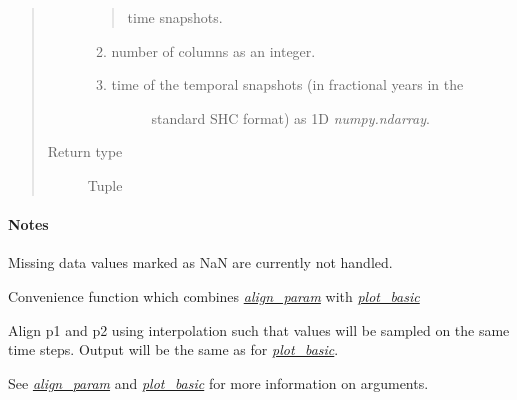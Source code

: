 \documentclass[letterpaper,10pt,english]{sphinxhowto}
\begin{document}
\begin{fulllineitems}
\begin{quote}
\begin{description}
\begin{quote}
time snapshots.
\end{quote}
\begin{enumerate}
\setcounter{enumi}{1}
\item {} 
number of columns as an integer.

\item {} \begin{description}
\item[{time of the temporal snapshots (in fractional years in the}] \leavevmode
standard SHC format) as 1D \emph{numpy.ndarray}.

\end{description}

\end{enumerate}


\item[{Return type}] \leavevmode
Tuple

\end{description}\end{quote}
\paragraph{Notes}

Missing data values marked as NaN are currently not handled.

\end{fulllineitems}


\begin{fulllineitems}
\label{swtools_doc:swtools.plot_align}
Convenience function which combines {\hyperref[swtools_doc:align\string-param]{\emph{align\_param}}} with {\hyperref[swtools_doc:plot\string-basic]{\emph{plot\_basic}}}

Align p1 and p2 using interpolation such that values will be sampled
on the same time steps. Output will be the same as for {\hyperref[swtools_doc:plot\string-basic]{\emph{plot\_basic}}}.

See {\hyperref[swtools_doc:align\string-param]{\emph{align\_param}}} and {\hyperref[swtools_doc:plot\string-basic]{\emph{plot\_basic}}} for more information on arguments.

\end{fulllineitems}
\end{document}
